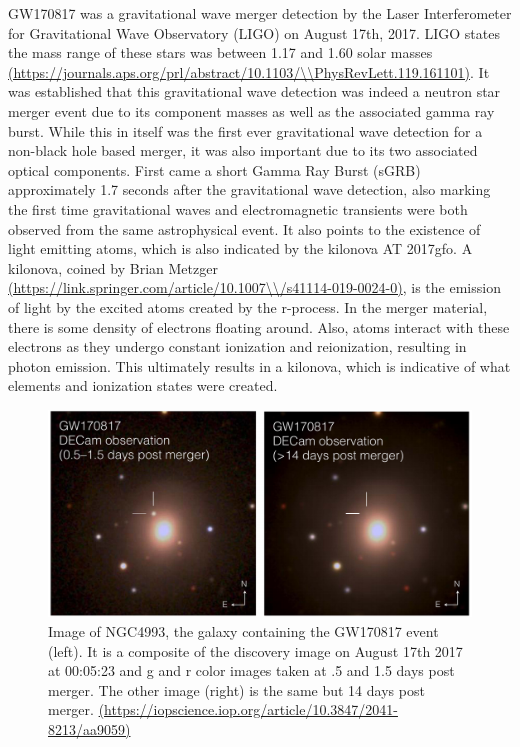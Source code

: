 \documentclass[11pt,a4paper]{article}
\begin{document}
GW170817 was a gravitational wave merger detection by the Laser Interferometer for Gravitational Wave Observatory (LIGO) on August 17th, 2017. LIGO states the mass range of these stars was between 1.17 and 1.60 solar masses \url{(https://journals.aps.org/prl/abstract/10.1103/\\PhysRevLett.119.161101)}. It was established that this gravitational wave detection was indeed a neutron star merger event due to its component masses as well as the associated gamma ray burst. While this in itself was the first ever gravitational wave detection for a non-black hole based merger, it was also important due to its two associated optical components. 
First came a short Gamma Ray Burst (sGRB) approximately 1.7 seconds after the gravitational wave detection, also marking the first time gravitational waves and electromagnetic transients were both observed from the same astrophysical event. It also points to the existence of light emitting atoms, which is also indicated by the kilonova AT 2017gfo. A kilonova, coined by Brian Metzger \url{(https://link.springer.com/article/10.1007\\/s41114-019-0024-0)}, is the emission of light by the excited atoms created by the r-process. In the merger material, there is some density of electrons floating around. Also, atoms interact with these electrons as they undergo constant ionization and reionization, resulting in photon emission. This ultimately results in a kilonova, which is indicative of what elements and ionization states were created. 

\begin{figure}[h!]
  \includegraphics[scale = .5, width=1\textwidth]{GW170817_pic.png}
  \caption{Image of NGC4993, the galaxy containing the GW170817 event (left). It is a composite of the discovery image on August 17th 2017 at 00:05:23 and g and r color images taken at .5 and 1.5 days post merger. The other image (right) is the same but 14 days post merger. \url{(https://iopscience.iop.org/article/10.3847/2041-8213/aa9059)}}
\end{figure}
\end{document}

